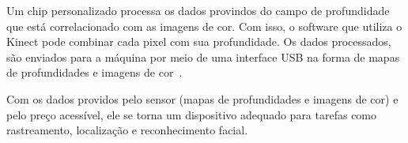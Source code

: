 Um chip personalizado processa os dados provindos do campo de profundidade que está correlacionado com as imagens de cor. Com isso, o software que utiliza o Kinect pode combinar cada pixel com sua profundidade. Os dados processados, são enviados para a máquina por meio de uma interface USB na forma de mapas de profundidades e imagens de cor~\cite{kinect}.

Com os dados providos pelo sensor (mapas de profundidades e imagens de cor) e pelo preço acessível, ele se torna um dispositivo adequado para tarefas como rastreamento, localização e reconhecimento facial.